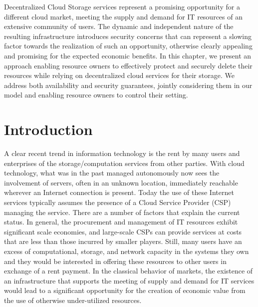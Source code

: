 Decentralized Cloud Storage services represent a promising opportunity
for a different cloud market, meeting the supply and demand for IT
resources of an extensive community of users.  The dynamic and
independent nature of the resulting infrastructure introduces security
concerns that can represent a slowing factor towards the realization
of such an opportunity, otherwise clearly appealing and promising for
the expected economic benefits.  In this chapter, we present an approach
enabling resource owners to effectively protect and securely delete
their resources while relying on decentralized cloud services for
their storage.
%
We address both availability and security
guarantees, jointly considering them in our model and enabling
resource owners to control their setting.

\section{Introduction}
\label{dcs:sec:intro}

A clear recent trend in information technology is the rent by many
users and enterprises of the storage/computation services from other
parties. With cloud technology, what was in the past managed
autonomously now sees the involvement of servers, often in an unknown
location, immediately reachable wherever an Internet connection is
present.  Today the use of these Internet services typically assumes
the presence of a Cloud Service Provider (CSP) managing the service.
There are a number of factors that explain the current status. In
general, the procurement and management of IT resources exhibit
significant scale economies, and large-scale CSPs can provide services
at costs that are less than those incurred by smaller players. Still,
many users have an excess of computational, storage, and network
capacity in the systems they own and they would be interested in
offering these resources to other users in exchange of a rent
payment. In the classical behavior of markets, the existence of an
infrastructure that supports the meeting of supply and demand for IT
services would lead to a significant opportunity for the creation of
economic value from the use of otherwise under-utilized resources.



